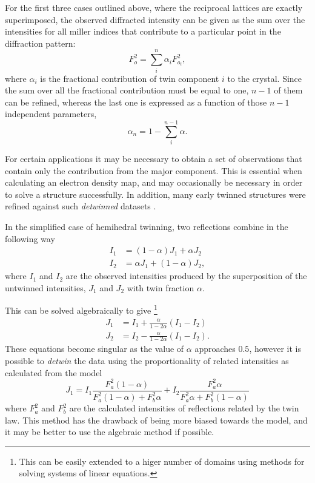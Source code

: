 \documentclass[pdf]{iucr}
\begin{document}
For the first three cases outlined above, where the reciprocal lattices are exactly superimposed, the observed diffracted intensity can be given as the sum over the intensities for all miller indices that contribute to a particular point in the diffraction pattern:
\begin{equation}
F_o^2 = \sum_i^{n}{\alpha_i F_{o_i}^2}
\label{eqn:twin_eq},
\end{equation}
where $\alpha_i$ is the fractional contribution of twin component $i$ to the crystal. Since the sum over all the fractional contribution must be equal to one, $n-1$ of them can be refined, whereas the last one is expressed as a function of those $n-1$ independent parameters,
\begin{equation}
\alpha_n = 1 - \sum_i^{n-1}{\alpha}
\label{eqn:twin_fractions}.
\end{equation}

For certain applications it may be necessary to obtain a set of observations that contain only the contribution from the major component. This is essential when calculating an electron density map, and may occasionally be necessary in order to solve a structure successfully. In addition, many early twinned structures were refined against such \emph{detwinned} datasets \cite{Grainger:1969aa,Murray-Rust:1973aa,Britton:1972aa}.

In the simplified case of hemihedral twinning, two reflections combine in the following way 
\begin{align}
I_1 &= (1 - \alpha) J_1 + \alpha J_2 \\
I_2 &= \alpha J_1 + (1- \alpha) J_2
\label{eqn:twin_frac}
,
\end{align}
where $I_1$ and $I_2$ are the observed intensities produced by the superposition of the untwinned intensities, $J_1$ and $J_2$ with twin fraction $\alpha$.

This can be solved algebraically \cite{Britton:1972aa,Grainger:1969aa,Zachariasen:1965aa} to give
\footnote{This can be easily extended to a higer number of domains using methods for solving systems of linear equations.}
\begin{align}
J_1 &= I_1 + \frac{\alpha}{1 - 2 \alpha} (I_1 - I_2) \\
J_2 &= I_2 - \frac{\alpha}{1 - 2 \alpha} (I_1 - I_2)
.
\label{eqn:detwin_alg}
\end{align}
These equations become singular as the value of $\alpha$ approaches $0.5$, however it is possible to \emph{detwin} the data using the proportionality of related intensities as calculated from the model
\begin{equation}
J_1 = I_1 \frac{F_a^2 (1 - \alpha)}{F_a^2 (1 - \alpha) + F_b^2 \alpha} + I_2 \frac{F_a^2 \alpha}{F_a^2 \alpha + F_b^2 (1 - \alpha)}
\label{eqn:detwin_prop}
\end{equation}
where $F_a^2$ and $F_b^2$ are the calculated intensities of reflections related by the twin law. This method has the drawback of being more biased towards the model, and it may be better to use the algebraic method if possible.
\end{document}
